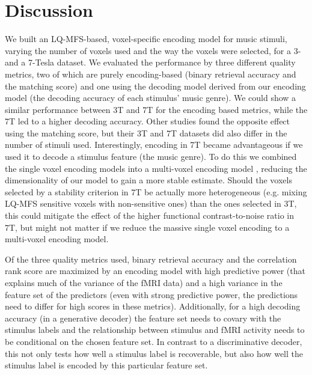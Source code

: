 

\section*{Discussion}

We built an LQ-MFS-based, voxel-specific encoding model
for music stimuli, varying the number of voxels used and the way the voxels were
selected, for a 3- and a 7-Tesla dataset. We evaluated the performance by three
different quality metrics, two of which are purely encoding-based (binary
retrieval accuracy and the matching score) and one using the decoding model
derived from our encoding model (the decoding accuracy of each stimulus' music genre). We could show a similar
performance between 3T and 7T for the encoding based metrics, while the 7T led
to a higher decoding accuracy. Other studies \citep[e.g.,][]{SF14} found the opposite
effect using the matching score, but their 3T and 7T datasets did also differ
in the number of stimuli used. Interestingly, encoding in 7T became
advantageous if we used it to decode a stimulus feature (the music genre). To
do this we combined the single voxel encoding models into a multi-voxel encoding
model \citep[see][]{NG09}, reducing the dimensionality of our model to gain a
more stable estimate. Should the voxels selected by a stability criterion in 7T
be actually more heterogeneous (e.g. mixing LQ-MFS sensitive voxels with
non-sensitive ones) than the ones selected in 3T, this could mitigate the
effect of the higher functional contrast-to-noise ratio in 7T, but might not
matter if we reduce the massive single voxel encoding to a multi-voxel encoding
model.

Of the three quality metrics used, binary retrieval accuracy and the
correlation rank score are maximized by an encoding model with high predictive
power (that explains much of the variance of the f{MRI} data) and a high
variance in the feature set of the predictors (even with strong predictive
power, the predictions need to differ for high scores in these metrics).
Additionally, for a high decoding accuracy (in a generative decoder) the
feature set needs to covary with the stimulus labels and the relationship
between stimulus and f{MRI} activity needs to be conditional on the chosen
feature set. In contrast to a discriminative decoder, this not only tests how
well a stimulus label is recoverable, but also how well the stimulus label is
encoded by this particular feature set.

